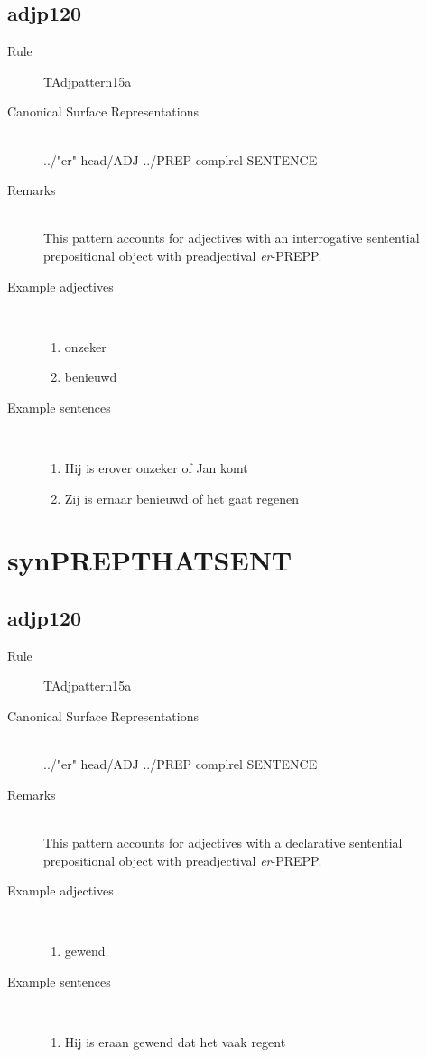   \subsection{adjp120}
\begin{description}
  \item [Rule] TAdjpattern15a
  \item [Canonical Surface Representations] \mbox{}\\ ../"er" head/ADJ ../PREP complrel
SENTENCE
  \item [Remarks] \mbox{}\\ 
This pattern accounts for adjectives with an interrogative
 sentential 
prepositional object with preadjectival {\em er}-PREPP.

  \item [Example adjectives] \mbox{}\\
\begin{enumerate}
  \item onzeker 
  \item benieuwd
\end{enumerate}
  \item [Example sentences]\mbox{}\\
\begin{enumerate}
  \item Hij is erover onzeker of Jan komt
  \item Zij is ernaar benieuwd  of het gaat regenen 
\end{enumerate}
\end{description}
\newpage
\section{synPREPTHATSENT}
  \subsection{adjp120}
\begin{description}
  \item [Rule] TAdjpattern15a
  \item [Canonical Surface Representations] \mbox{}\\ ../"er" head/ADJ ../PREP complrel
SENTENCE
  \item [Remarks] \mbox{}\\ 
This pattern accounts for adjectives with a declarative
 sentential 
prepositional object with preadjectival {\em er}-PREPP.

  \item [Example adjectives] \mbox{}\\
\begin{enumerate}
  \item gewend
\end{enumerate}
  \item [Example sentences]\mbox{}\\
\begin{enumerate}
  \item Hij is eraan gewend dat het vaak regent
\end{enumerate}
\end{description}
\newpage

